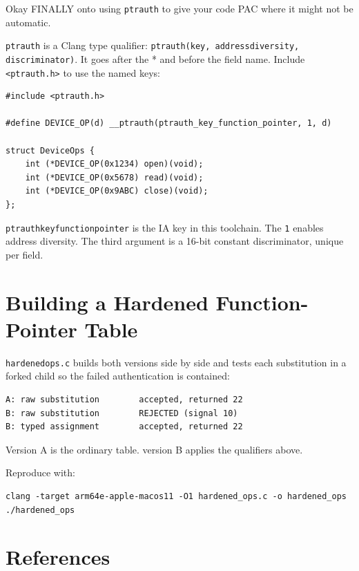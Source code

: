 Okay FINALLY onto using \texttt{\uscore{}\uscore{}ptrauth} to give your code PAC where it might not be automatic.

\texttt{\uscore{}\uscore{}ptrauth} is a Clang type qualifier: \texttt{\uscore{}\uscore{}ptrauth(key, address\uscore{}diversity, discriminator)}. It goes after the * and before the field name. Include \texttt{<ptrauth.h>} to use the named keys:

\begin{verbatim}
#include <ptrauth.h>

#define DEVICE_OP(d) __ptrauth(ptrauth_key_function_pointer, 1, d)

struct DeviceOps {
    int (*DEVICE_OP(0x1234) open)(void);
    int (*DEVICE_OP(0x5678) read)(void);
    int (*DEVICE_OP(0x9ABC) close)(void);
};
\end{verbatim}

\texttt{ptrauth\uscore{}key\uscore{}function\uscore{}pointer} is the IA key in this toolchain. The \texttt{1} enables address diversity. The third argument is a 16-bit constant discriminator, unique per field.

\section{Building a Hardened Function-Pointer Table}

\texttt{hardened\uscore{}ops.c} builds both versions side by side and tests each substitution in a forked child so the failed authentication is contained:

\begin{verbatim}
A: raw substitution        accepted, returned 22
B: raw substitution        REJECTED (signal 10)
B: typed assignment        accepted, returned 22
\end{verbatim}

Version A is the ordinary table. version B applies the qualifiers above.

Reproduce with:

\begin{verbatim}
clang -target arm64e-apple-macos11 -O1 hardened_ops.c -o hardened_ops
./hardened_ops
\end{verbatim}

\section{References}

